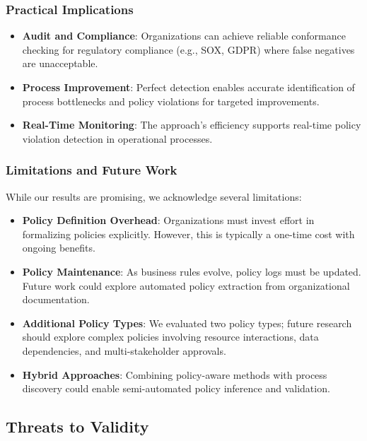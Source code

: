 \subsubsection{Practical Implications}

\begin{itemize}
    \item \textbf{Audit and Compliance}: Organizations can achieve reliable conformance checking for regulatory compliance (e.g., SOX, GDPR) where false negatives are unacceptable.

    \item \textbf{Process Improvement}: Perfect detection enables accurate identification of process bottlenecks and policy violations for targeted improvements.

    \item \textbf{Real-Time Monitoring}: The approach's efficiency supports real-time policy violation detection in operational processes.
\end{itemize}

\subsubsection{Limitations and Future Work}

While our results are promising, we acknowledge several limitations:

\begin{itemize}
    \item \textbf{Policy Definition Overhead}: Organizations must invest effort in formalizing policies explicitly. However, this is typically a one-time cost with ongoing benefits.

    \item \textbf{Policy Maintenance}: As business rules evolve, policy logs must be updated. Future work could explore automated policy extraction from organizational documentation.

    \item \textbf{Additional Policy Types}: We evaluated two policy types; future research should explore complex policies involving resource interactions, data dependencies, and multi-stakeholder approvals.

    \item \textbf{Hybrid Approaches}: Combining policy-aware methods with process discovery could enable semi-automated policy inference and validation.
\end{itemize}

\subsection{Threats to Validity}

